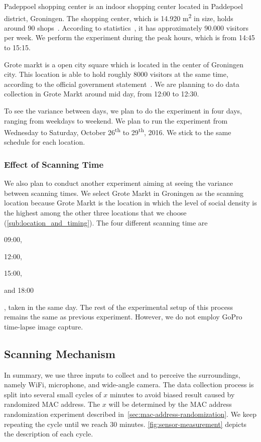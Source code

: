 Padeppoel shopping center is an indoor shopping center located in Paddepoel district, Groningen. The shopping center, which is 14.920 m\textsuperscript{2} in size, holds around 90 shops~\cite{paddepoelstat}. According to statistics~\cite{paddepoelstat}, it has approximately 90.000 visitors per week. We perform the experiment during the peak hours, which is from 14:45 to 15:15.

Grote markt is a open city square which is located in the center of Groningen city. This location is able to hold roughly 8000 visitors at the same time, according to the official government statement~\cite{GemeenteGroningen2016}. We are planning to do data collection in Grote Markt around mid day, from 12:00 to 12:30.

To see the variance between days, we plan to do the experiment in four days, ranging from weekdays to weekend. We plan to run the experiment from Wednesday to Saturday, October 26\textsuperscript{th} to 29\textsuperscript{th}, 2016. We stick to the same schedule for each location.

\subsubsection{Effect of Scanning Time} %
\label{ssub:effect_of_scanning_time}
We also plan to conduct another experiment aiming at seeing the variance between scanning times. We select Grote Markt in Groningen as the scanning location because Grote Markt is the location in which the level of social density is the highest among the other three locations that we choose (\autoref{sub:location_and_timing}). The four different scanning time are
\begin{enumerate*}[label={\alph*)},font={\color{red!50!black}\bfseries}]
  \item 09:00,
  \item 12:00,
  \item 15:00,
  \item and 18:00
\end{enumerate*},
taken in the same day. The rest of the experimental setup of this process remains the same as previous experiment. However, we do not employ GoPro time-lapse image capture.

\subsection{Scanning Mechanism} %
\label{sub:scanning}
In summary, we use three inputs to collect and to perceive the surroundings, namely WiFi, microphone, and wide-angle camera. The data collection process is split into several small cycles of $x$ minutes to avoid biased result caused by randomized \ac{MAC} address. The $x$ will be determined by the \ac{MAC} address randomization experiment described in~\autoref{sec:mac-address-randomization}. We keep repeating the cycle until we reach 30 minutes. \autoref{fig:sensor-measurement} depicts the description of each cycle.

